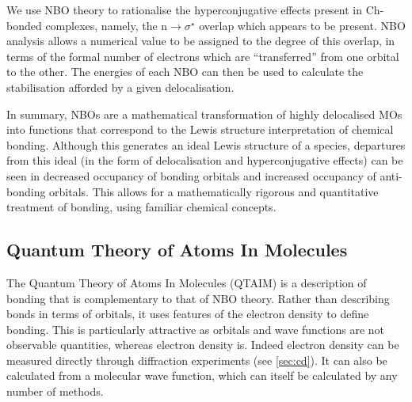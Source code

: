 \begin{refsection}
We use NBO theory to rationalise the hyperconjugative effects present in Ch-bonded complexes, namely, the $ \text{n}\rightarrow\sigma^{\star} $ overlap which appears to be present.
NBO analysis allows a numerical value to be assigned to the degree of this overlap, in terms of the formal number of electrons which are ``transferred'' from one orbital to the other.
The energies of each NBO can then be used to calculate the stabilisation afforded by a given delocalisation.

In summary, NBOs are a mathematical transformation of highly delocalised MOs into functions that correspond to the Lewis structure interpretation of chemical bonding.
Although this generates an ideal Lewis structure of a species, departures from this ideal (in the form of delocalisation and hyperconjugative effects) can be seen in decreased occupancy of bonding orbitals and increased occupancy of anti-bonding orbitals.
This allows for a mathematically rigorous and quantitative treatment of bonding, using familiar chemical concepts.

\subsection{Quantum Theory of Atoms In Molecules}\label{sec:qtaim}
The Quantum Theory of Atoms In Molecules (QTAIM) is a description of bonding that is complementary to that of NBO theory.\autocite{Bader1991}
Rather than describing bonds in terms of orbitals, it uses features of the electron density to define bonding.
This is particularly attractive as orbitals and wave functions are not observable quantities, whereas electron density is.
Indeed electron density can be measured directly through diffraction experiments (see \cref{sec:cd}).
It can also be calculated from a molecular wave function, which can itself be calculated by any number of methods.


\end{refsection}
